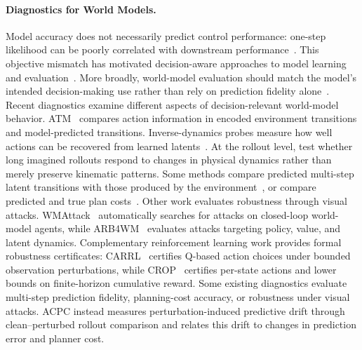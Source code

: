 \documentclass{article}
\begin{document}
\paragraph{Diagnostics for World Models.}
Model accuracy does not necessarily predict control performance:
one-step likelihood can be poorly correlated with downstream
performance~\citep{lambert2020objective}.
This objective mismatch has motivated decision-aware approaches to model
learning and evaluation~\citep{wei2024objectivemismatch}.
More broadly, world-model evaluation should match the model's intended
decision-making use rather than rely on prediction fidelity
alone~\citep{yu2026worldmodelevaluation}.
Recent diagnostics examine different aspects of decision-relevant world-model
behavior. ATM~\citep{chen2026atm} compares action information in encoded
environment transitions and model-predicted transitions. Inverse-dynamics
probes measure how well actions can be recovered from learned
latents~\citep{yeom2026actionrelevant}. At the rollout level,
\citet{schaefer2026kinematic} test whether long imagined rollouts respond to
changes in physical dynamics rather than merely preserve kinematic patterns.
Some methods compare predicted multi-step latent transitions with those
produced by the environment~\citep{vakalis2026operator}, or compare predicted
and true plan costs~\citep{you2026controlpredictability}.
Other work evaluates robustness through visual attacks.
\mbox{WMAttack}~\citep{guo2026wmattack} automatically searches for attacks on
closed-loop world-model agents, while ARB4WM~\citep{zhang2026arb4wm} evaluates
attacks targeting policy, value, and latent dynamics.
Complementary reinforcement learning work provides formal robustness certificates:
CARRL~\citep{lutjens2020certifiedrl} certifies Q-based action choices under
bounded observation perturbations, while CROP~\citep{wu2022crop} certifies
per-state actions and lower bounds on finite-horizon cumulative reward.
Some existing diagnostics evaluate multi-step prediction fidelity, planning-cost accuracy, or robustness under visual attacks. ACPC instead measures perturbation-induced predictive drift through clean--perturbed rollout comparison and relates this drift to changes in prediction error and planner cost.
\end{document}
